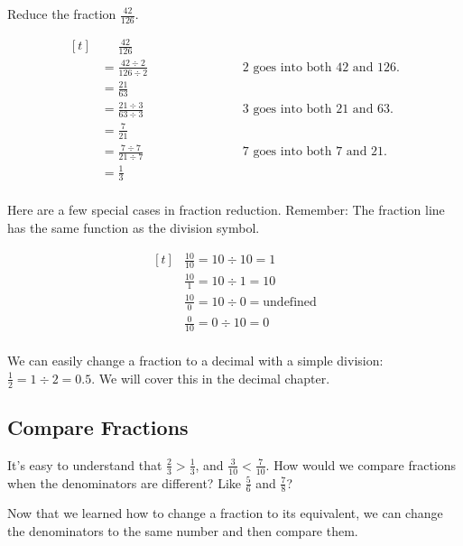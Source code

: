 \begin{myexample}
Reduce the fraction $\frac{42}{126}$.
\end{myexample}
\begin{solution}
\[
\begin{aligned}[t]
   &\phantom{{}=} \frac{42}{126} \\
   &= \frac{42\div2}{126\div2} &\phantom{=====}\text{2 goes into both 42 and 126.} \\
   &= \frac{21}{63} \\
   &= \frac{21\div3}{63\div3} &\phantom{=====}\text{3 goes into both 21 and 63.} \\
   &= \frac{7}{21} \\
   &= \frac{7\div7}{21\div7} &\phantom{=====}\text{7 goes into both 7 and 21.} \\
   &= \frac{1}{3}\\
\end{aligned}
\]
\end{solution}

Here are a few special cases in fraction reduction. Remember: The fraction line has the same function as the division symbol.

\[
\begin{aligned}[t]
   &\frac{10}{10}=10\div10=1 \\
   &\frac{10}{1}=10\div1=10 \\
   &\frac{10}{0}=10\div0=\text{undefined} \\
   &\frac{0}{10}=0\div10=0 \\
\end{aligned}
\]

We can easily change a fraction to a decimal with a simple division: $\frac{1}{2}=1\div2=0.5$. We will cover this in the decimal chapter.

\subsection{Compare Fractions}
It's easy to understand that $\frac{2}{3}>\frac{1}{3}$, and $\frac{3}{10}<\frac{7}{10}$. How would we compare fractions when the denominators are different? Like $\frac{5}{6}$ and $\frac{7}{8}$?

Now that we learned how to change a fraction to its equivalent, we can change the denominators to the same number and then compare them.

